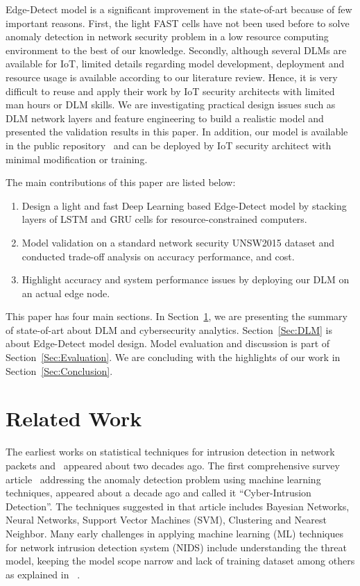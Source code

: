 \documentclass[conference]{IEEEtran}
\begin{document}
Edge-Detect model is a significant improvement in the state-of-art because of few important reasons. First, the light FAST cells have not been used before to solve anomaly detection in network security problem in a low resource computing environment to the best of our knowledge.
Secondly, although several DLMs are available for IoT, limited details regarding model development, deployment and resource usage is available according to our literature review. 
Hence, it is very difficult to reuse and apply their work by IoT security architects with limited man hours or DLM skills. 
We are investigating practical design issues such as DLM network layers and feature engineering to build a realistic model and presented the validation results in this paper. 
In addition, our model is available in the public repository~\cite{rac_edd_github} and can be deployed by IoT security architect with minimal modification or training. 

The main contributions of this paper are listed below: 
\begin{enumerate}
\item Design a light and fast Deep Learning based Edge-Detect model by stacking layers of LSTM and GRU cells for resource-constrained computers. 
\item Model validation on a standard network security UNSW2015 dataset and conducted trade-off analysis on accuracy performance, and cost. 
\item Highlight accuracy and system performance issues by deploying our DLM on an actual edge node. 
\end{enumerate}

This paper has four main sections. In Section~\ref{Sec:related_work}, we are presenting the summary of state-of-art about DLM and cybersecurity analytics. Section~\ref{Sec:DLM} is about Edge-Detect model design. Model evaluation and discussion is part of Section~\ref{Sec:Evaluation}. We are concluding with the highlights of our work in Section~\ref{Sec:Conclusion}.

\section{Related Work} \label{Sec:related_work}

\noindent The earliest works on statistical techniques for intrusion detection in network packets \cite{anderson1995detecting} and~\cite{mauricio1998neural} appeared about two decades ago. The first comprehensive survey article~\cite{chandola2009anomaly} addressing the anomaly detection problem using machine learning techniques, appeared about a decade ago and called it ``Cyber-Intrusion Detection''. The techniques suggested in that article includes Bayesian Networks, Neural Networks, Support Vector Machines (SVM), Clustering and Nearest Neighbor. Many early challenges in applying  machine learning (ML) techniques for network intrusion detection system (NIDS) include understanding the threat model, keeping the model scope narrow and lack of training dataset among others as explained in ~\cite{sommer2010outside}. 
\end{document}
